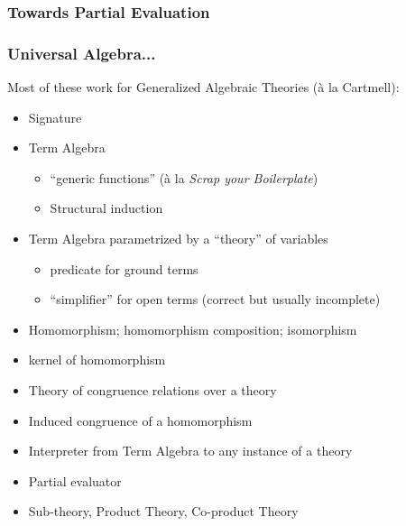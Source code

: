 \documentclass{beamer}
\newcommand{\sred}[1]{\textcolor{slidered}{#1}}
\begin{document}
\begin{frame}
\frametitle{Towards Partial Evaluation}
{\tiny
{}
\vspace*{-0.5cm}
\vspace*{-0.5cm}
\begin{overprint}
\end{overprint}
}
\end{frame}

\begin{frame}
\frametitle{Universal Algebra...}
Most of these work for Generalized Algebraic Theories (\`{a} la Cartmell):
\begin{itemize}
\item Signature
\item Term Algebra
\begin{itemize}
\item ``generic functions'' (\`{a} la \textit{Scrap your Boilerplate})
\item Structural induction
\end{itemize}
\item Term Algebra parametrized by a ``theory'' of variables
\begin{itemize}
\item predicate for ground terms
\item ``simplifier'' for open terms (correct but usually incomplete)
\end{itemize}
\item Homomorphism; homomorphism composition; isomorphism
\item kernel of homomorphism
\item Theory of congruence relations over a theory
\item Induced congruence of a homomorphism 
\item Interpreter from Term Algebra to any instance of a theory
\item \sred{Partial evaluator}
\item Sub-theory, Product Theory, Co-product Theory
\end{itemize}
\end{frame}
\end{document}
